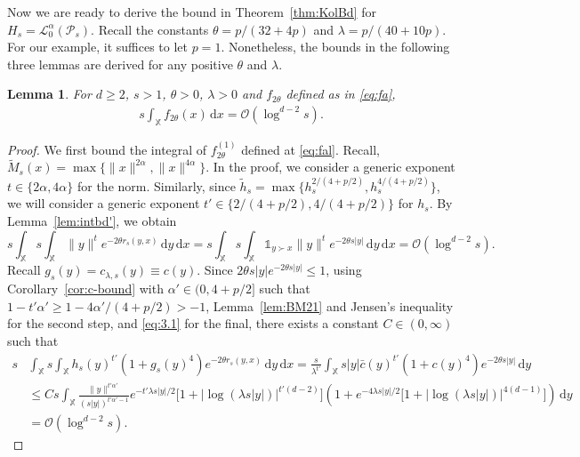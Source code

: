 \documentclass[11pt,reqno]{amsart}
\numberwithin{equation}{section}
\newtheorem{lemma}[theorem]{Lemma}
\theoremstyle{definition}
\newcommand{\sP}{\mathcal{P}}
\newcommand{\XX}{\mathbb{X}}
\newcommand{\diff}{{\,\mathrm d}}
\begin{document}
Now we are ready to derive the bound in
Theorem~\ref{thm:KolBd} for $H_s=\mathscr{L}_0^\alpha(\sP_{s})$. 
Recall the constants $\theta=p /(32+4 p)$
and $\lambda=p/(40+10p)$. For our example, it suffices to let
$p=1$. Nonetheless, the bounds in the following three lemmas are derived for any positive $\theta$
and $\lambda$.

\begin{lemma}
	\label{lem:intg1s}
	For $d \ge 2$, $s>1$, $\theta>0$, $\lambda>0$ and $f_{2\theta}$
	defined as in \eqref{eq:fa},
	\begin{align*}
	s \int_{\XX} f_{2\theta}(x) \diff x=\mathcal{O}(\log^{d-2}s).
	\end{align*}
\end{lemma}

\begin{proof} 
	We first bound the integral of $f_{2\theta}^{(1)}$ defined at \eqref{eq:fal}. Recall, $\widetilde{M}_{s}(x)=\max\{\|x\|^{2\alpha},\|x\|^{4\alpha}\}$. In the proof, we consider a generic exponent $t \in \{2\alpha, 4\alpha\}$ for the norm. Similarly, since $\tilde h_s = \max\{h_s^{2/(4+p/2)}, h_s^{4/(4+p/2)}\}$, we will consider a generic exponent $t' \in \{2/(4+p/2), 4/(4+p/2)\}$ for $h_s$. By Lemma~\ref{lem:intbd'}, we obtain
	\begin{equation}\label{eq:d}
	s\int_{\XX} s\int_{\XX} \|y\|^t e^{-2\theta r_s(y,x)}\diff y
	\diff x =  s \int_{\XX} s \int_\XX \mathds{1}_{y \succ x} \|y\|^t
	e^{- 2\theta s |y|}\diff y
	\diff x
	=\mathcal{O}(\log^{d-2} s). 
	\end{equation}
	Recall $g_{s}(y)=c_{\lambda,s}(y) \equiv c(y)$. Since $2\theta s|y|e^{- 2\theta s |y|} \le 1$, using Corollary~\ref{cor:c-bound} with $\alpha'\in (0,4+p/2]$ such that $1-t'\alpha' \ge 1-4 \alpha'/(4+p/2)>-1$,
	Lemma~\ref{lem:BM21} and Jensen's inequality for the second step, and \eqref{eq:3.1} for the final, there exists a constant $C \in (0,\infty)$ such that
	\begin{align}\label{eq:2.1}
	s &\int_{\XX} s \int_{\XX} h_s(y)^{t'} (1+g_{s}(y)^4) e^{- 2\theta r_s(y,x)}  \diff y \diff x
	= \frac{s}{\lambda^{t'}} \int_{\XX} s|y| \bar c (y)^{t'} (1+c(y)^4)
	e^{- 2\theta s |y|}  \diff y \nonumber \\
	&\le Cs \int_{\XX}
	\frac{\|y\|^{t'\alpha'}}{(s|y|)^{t'\alpha'-1}} e^{-t' \lambda s|y|/2}\Big[1+\big|\log(\lambda s|y|)\big|^{t'(d-2)}\Big] \left(1+e^{-4\lambda s|y|/2}\Big[1+\big|\log(\lambda s|y|)\big|^{4(d-1)}\Big]\right) \diff y \nonumber\\
	&=\mathcal{O}(\log^{d-2} s).

\end{align}
\end{proof}
\end{document}
